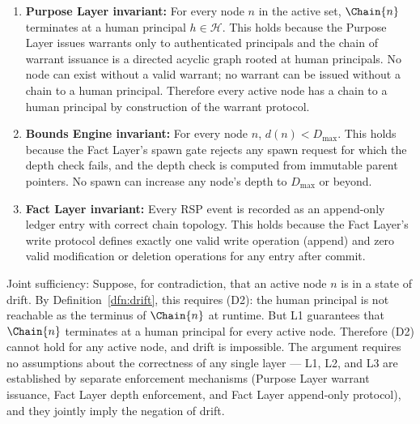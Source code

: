 \begin{enumerate}
\item[\textbf{L1}] \textbf{Purpose Layer invariant:} For every node $n$ in the active set, $\Chain{n}$ terminates at a human principal $h \in \mathcal{H}$. This holds because the Purpose Layer issues warrants only to authenticated principals and the chain of warrant issuance is a directed acyclic graph rooted at human principals. No node can exist without a valid warrant; no warrant can be issued without a chain to a human principal. Therefore every active node has a chain to a human principal by construction of the warrant protocol.

\item[\textbf{L2}] \textbf{Bounds Engine invariant:} For every node $n$, $d(n) < D_{\max}$. This holds because the Fact Layer's spawn gate rejects any spawn request for which the depth check fails, and the depth check is computed from immutable parent pointers. No spawn can increase any node's depth to $D_{\max}$ or beyond.

\item[\textbf{L3}] \textbf{Fact Layer invariant:} Every RSP event is recorded as an append-only ledger entry with correct chain topology. This holds because the Fact Layer's write protocol defines exactly one valid write operation (append) and zero valid modification or deletion operations for any entry after commit.
\end{enumerate}

Joint sufficiency: Suppose, for contradiction, that an active node $n$ is in a state of drift. By Definition~\ref{dfn:drift}, this requires (D2): the human principal is not reachable as the terminus of $\Chain{n}$ at runtime. But L1 guarantees that $\Chain{n}$ terminates at a human principal for every active node. Therefore (D2) cannot hold for any active node, and drift is impossible. The argument requires no assumptions about the correctness of any single layer — L1, L2, and L3 are established by separate enforcement mechanisms (Purpose Layer warrant issuance, Fact Layer depth enforcement, and Fact Layer append-only protocol), and they jointly imply the negation of drift.

